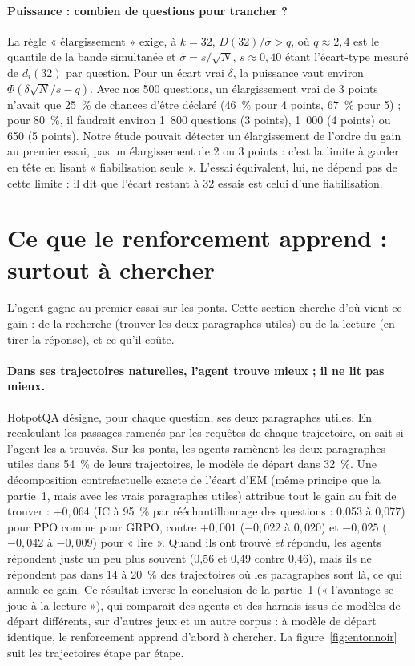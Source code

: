 \paragraph{Puissance : combien de questions pour trancher ?} La règle « élargissement » exige, à $k = 32$, $D(32)/\hat\sigma > q$, où $q \approx 2{,}4$ est le quantile de la bande simultanée et $\hat\sigma = s/\sqrt{N}$, $s \approx 0{,}40$ étant l'écart-type mesuré de $d_i(32)$ par question. Pour un écart vrai $\delta$, la puissance vaut environ $\Phi(\delta\sqrt{N}/s - q)$. Avec nos 500 questions, un élargissement vrai de 3 points n'avait que 25~\% de chances d'être déclaré (46~\% pour 4 points, 67~\% pour 5) ; pour 80~\%, il faudrait environ 1~800 questions (3 points), 1~000 (4 points) ou 650 (5 points). Notre étude pouvait détecter un élargissement de l'ordre du gain au premier essai, pas un élargissement de 2 ou 3 points : c'est la limite à garder en tête en lisant « fiabilisation seule ». L'essai équivalent, lui, ne dépend pas de cette limite : il dit que l'écart restant à 32 essais est celui d'une fiabilisation.

\section{Ce que le renforcement apprend : surtout à chercher}\label{sec:apprend-p2}

L'agent gagne au premier essai sur les ponts. Cette section cherche d'où vient ce gain : de la recherche (trouver les deux paragraphes utiles) ou de la lecture (en tirer la réponse), et ce qu'il coûte.

\paragraph{Dans ses trajectoires naturelles, l'agent trouve mieux ; il ne lit pas mieux.} HotpotQA désigne, pour chaque question, ses deux paragraphes utiles. En recalculant les passages ramenés par les requêtes de chaque trajectoire, on sait si l'agent les a trouvés. Sur les ponts, les agents ramènent les deux paragraphes utiles dans 54~\% de leurs trajectoires, le modèle de départ dans 32~\%. Une décomposition contrefactuelle exacte de l'écart d'EM (même principe que la partie~1, mais avec les vrais paragraphes utiles) attribue tout le gain au fait de trouver : $+0{,}064$ (IC à 95~\% par rééchantillonnage des questions : 0,053 à 0,077) pour PPO comme pour GRPO, contre $+0{,}001$ ($-0{,}022$ à $0{,}020$) et $-0{,}025$ ($-0{,}042$ à $-0{,}009$) pour « lire ». Quand ils ont trouvé \emph{et} répondu, les agents répondent juste un peu plus souvent (0,56 et 0,49 contre 0,46), mais ils ne répondent pas dans 14 à 20~\% des trajectoires où les paragraphes sont là, ce qui annule ce gain. Ce résultat inverse la conclusion de la partie~1 (« l'avantage se joue à la lecture »), qui comparait des agents et des harnais issus de modèles de départ différents, sur d'autres jeux et un autre corpus : à modèle de départ identique, le renforcement apprend d'abord à chercher. La figure~\ref{fig:entonnoir} suit les trajectoires étape par étape.

